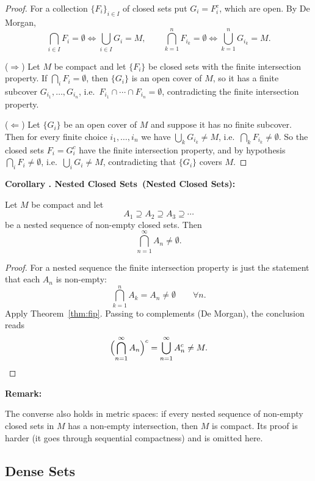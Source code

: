 \documentclass[11pt,a4paper]{article}
\newcounter{thmcnt}[section]
\renewcommand{\thethmcnt}{\thesection.\arabic{thmcnt}}
\newenvironment{corollary}[1][]{
	\def\temp{#1}%
	\refstepcounter{thmcnt}
	\begin{corollarybox}
		\textbf{\color{corollaryColor}Corollary \thethmcnt%
			\ifx\temp\empty\relax\else\ (#1)\fi:} 
	}{
	\end{corollarybox}
}
\newenvironment{remark}{
	\begin{remarkbox}
		\textbf{\color{remarkColor}Remark:} 
	}{
	\end{remarkbox}
}
\begin{document}
\begin{proof}
	For a collection $\{F_i\}_{i\in I}$ of closed sets put $G_i = F_i^c$, which are open. By De Morgan,
	\[
	\bigcap_{i\in I} F_i = \emptyset \iff \bigcup_{i\in I} G_i = M,
	\qquad
	\bigcap_{k=1}^{n} F_{i_k} = \emptyset \iff \bigcup_{k=1}^{n} G_{i_k} = M .
	\]
	
	\noindent ($\Rightarrow$) Let $M$ be compact and let $\{F_i\}$ be closed sets with the finite intersection property. If $\bigcap_i F_i = \emptyset$, then $\{G_i\}$ is an open cover of $M$, so it has a finite subcover $G_{i_1},\dots,G_{i_n}$, i.e.\ $F_{i_1}\cap\cdots\cap F_{i_n}=\emptyset$, contradicting the finite intersection property.
	
	\medskip
	\noindent ($\Leftarrow$) Let $\{G_i\}$ be an open cover of $M$ and suppose it has no finite subcover. Then for every finite choice $i_1,\dots,i_n$ we have $\bigcup_k G_{i_k}\neq M$, i.e.\ $\bigcap_k F_{i_k}\neq\emptyset$. So the closed sets $F_i = G_i^c$ have the finite intersection property, and by hypothesis $\bigcap_i F_i\neq\emptyset$, i.e.\ $\bigcup_i G_i\neq M$, contradicting that $\{G_i\}$ covers $M$.
\end{proof}

\begin{corollary}[Nested Closed Sets]
	Let $M$ be compact and let
	\[
	A_1 \supseteq A_2 \supseteq A_3 \supseteq \cdots
	\]
	be a nested sequence of non-empty closed sets. Then
	\[
	\bigcap_{n=1}^{\infty} A_n \neq \emptyset .
	\]
\end{corollary}

\begin{proof}
	For a nested sequence the finite intersection property is just the statement that each $A_n$ is non-empty:
	\[
	\bigcap_{k=1}^{n} A_k = A_n \neq \emptyset \qquad \forall n .
	\]
	Apply Theorem~\ref{thm:fip}. Passing to complements (De Morgan), the conclusion reads
	\[
	\Bigl(\bigcap_{n=1}^{\infty} A_n\Bigr)^{c} = \bigcup_{n=1}^{\infty} A_n^{c} \neq M . \qedhere
	\]
\end{proof}

\begin{remark}
	The converse also holds in metric spaces: if every nested sequence of non-empty closed sets in $M$ has a non-empty intersection, then $M$ is compact. Its proof is harder (it goes through sequential compactness) and is omitted here.
\end{remark}

\subsection{Dense Sets}
\end{document}
